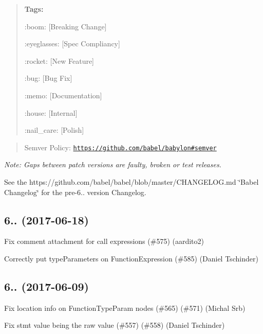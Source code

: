 \begin{quote}
{\bfseries Tags\+:}
\begin{DoxyItemize}
\item \+:boom\+: \mbox{[}Breaking Change\mbox{]}
\item \+:eyeglasses\+: \mbox{[}Spec Compliancy\mbox{]}
\item \+:rocket\+: \mbox{[}New Feature\mbox{]}
\item \+:bug\+: \mbox{[}Bug Fix\mbox{]}
\item \+:memo\+: \mbox{[}Documentation\mbox{]}
\item \+:house\+: \mbox{[}Internal\mbox{]}
\item \+:nail\+\_\+care\+: \mbox{[}Polish\mbox{]} 
\end{DoxyItemize}\end{quote}


\begin{quote}
Semver Policy\+: \href{https://github.com/babel/babylon#semver}{\tt https\+://github.\+com/babel/babylon\#semver} \end{quote}


{\itshape Note\+: Gaps between patch versions are faulty, broken or test releases.}

See the https\+://github.com/babel/babel/blob/master/\+C\+H\+A\+N\+G\+E\+L\+O\+G.\+md \char`\"{}\+Babel Changelog\char`\"{} for the pre-\/6.. version Changelog.

\subsection*{6.. (2017-\/06-\/18)}


\begin{DoxyItemize}
\item Fix comment attachment for call expressions (\#575) (aardito2)
\item Correctly put type\+Parameters on Function\+Expression (\#585) (Daniel Tschinder)
\end{DoxyItemize}

\subsection*{6.. (2017-\/06-\/09)}


\begin{DoxyItemize}
\item Fix location info on Function\+Type\+Param nodes (\#565) (\#571) (Michal Srb)
\item Fix stmt value being the raw value (\#557) (\#558) (Daniel Tschinder)
\end{DoxyItemize}

